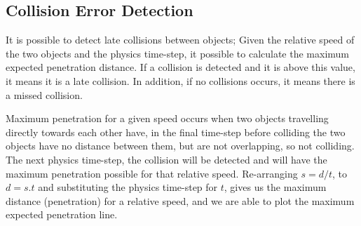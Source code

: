 \subsection{Collision Error Detection}
It is possible to detect late collisions between objects; Given the relative speed of the two objects and the physics time-step, it possible to calculate the maximum expected penetration distance. If a collision is detected and it is above this value, it means it is a late collision. In addition, if no collisions occurs, it means there is a missed collision.

Maximum penetration for a given speed occurs when two objects travelling directly towards each other have, in the final time-step before colliding the two objects have no distance between them, but are not overlapping, so not colliding. The next physics time-step, the collision will be detected and will have the maximum penetration possible for that relative speed. Re-arranging $s=d/t$, to $d=s.t$ and substituting the physics time-step for $t$, gives us the maximum distance (penetration) for a relative speed, and we are able to plot the maximum expected penetration line.





